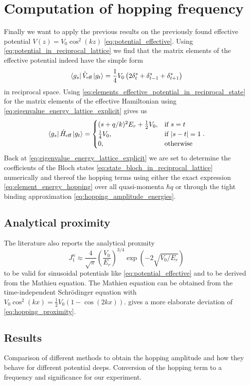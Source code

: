 \section{Computation of hopping frequency}

Finally we want to apply the previous results on the previously found
effective potential $V(z)=V_0\cos^2(kz)$ \cref{eq:potential_effective}. Using
\cref{eq:potential_in_reciprocal_lattice} we find that the matrix elements of
the effective potential indeed have the simple form
\begin{equation}
  \bra{g_s}\hat{V}_\text{eff}\ket{g_t}
  =\frac{1}{4}V_0\left(2\delta^s_t+\delta^s_{t-1}+\delta^s_{t+1}\right)
  \label{eq:elements_effective_potential_in_reciprocal_state}
\end{equation}
in reciprocal space. Using
\cref{eq:elements_effective_potential_in_reciprocal_state} for the matrix
elements of the effective Hamiltonian using
\cref{eq:eigenvalue_energy_lattice_explicit} gives us
\begin{equation}
  \bra{g_s}\hat{H}_\text{eff}\ket{g_t}
  =\begin{cases}
    (s+q/k)^2E_r+\frac{1}{2}V_0, & \text{if }s=t\\
    \frac{1}{4}V_0, & \text{if } \abs{s-t}=1\\
    0, & \text{otherwise}
  \end{cases}.
\end{equation}
Back at \cref{eq:eigenvalue_energy_lattice_explicit} we are set to determine
the coefficients of the Bloch states
\cref{eq:state_bloch_in_reciprocal_lattice} numerically and thereof the
hopping terms using either the exact expression
\cref{eq:element_energy_hopping} over all quasi-momenta $\hbar q$ or through
the tight binding approximation \cref{eq:hopping_amplitude_energies}.

\subsection{Analytical proximity}

The literature \cite{Bloch2008} also reports the analytical proxmity
\begin{equation}
  J^n_1\approx
  \frac{4}{\sqrt{\pi}}\left(\frac{V_0}{E_r}\right)^{3/4}\exp(-2\sqrt{V_0/E_r})
  \label{eq:hopping_proximity}
\end{equation}
to be valid for sinusoidal potentials like \cref{eq:potential_effective} and
to be derived from the Mathieu equation. The Mathieu equation can be obtained
from the time-independent Schrödinger equation with
$V_0\cos^2(kx)=\frac{1}{2}V_0\left(1-\cos(2kx)\right)$. \cite{Connor1984}
gives a more elaborate deviation of \cref{eq:hopping_proximity}.

\subsection{Results}

Comparison of different methods to obtain the hopping amplitude and how
they behave for different potential deeps. Conversion of the hopping term to
a frequency and significance for our experiment.
